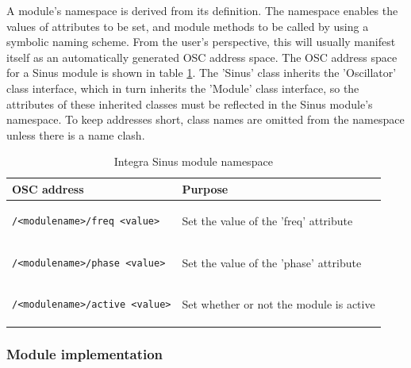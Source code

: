 \documentclass{article}
\begin{document}
A module's namespace is derived from its definition. The namespace
enables the values of attributes to be set, and module methods to be
called by using a symbolic naming scheme.  From the user's
perspective, this will usually manifest itself as an automatically
generated OSC address space. The OSC address space for a Sinus module
is shown in table \ref{tab:module_namespace}. The 'Sinus' class
inherits the 'Oscillator' class interface, which in turn inherits the
'Module' class interface, so the attributes of these inherited classes
must be reflected in the Sinus module's namespace. To keep addresses
short, class names are omitted from the namespace unless there is a
name clash.

\begin{table}
\begin{center}
\begin{tabular}{|p{13em}|p{8em}|}
\hline
\textbf{OSC address} & \textbf{Purpose} \\
\hline
\begin{minipage}[0pt]{10em}
\footnotesize {
\begin{verbatim}/<modulename>/freq <value>\end{verbatim}}\end{minipage}  & \small{Set the value of the 'freq' attribute} \\
\hline
\begin{minipage}[0pt]{10em}
\footnotesize {
\begin{verbatim}/<modulename>/phase <value>\end{verbatim}}\end{minipage}  & \small{Set the value of the 'phase' attribute} \\
\hline
\begin{minipage}[0pt]{10em}
\footnotesize {
\begin{verbatim}/<modulename>/active <value>
\end{verbatim}} \end{minipage} & \small{Set whether or not the module is active} \\
\hline
\end{tabular} 
\end{center}
\caption{Integra Sinus module namespace}
\label{tab:module_namespace}
\end{table}

\subsubsection{Module implementation}\label{subsubsec:module_implementation}
\end{document}
